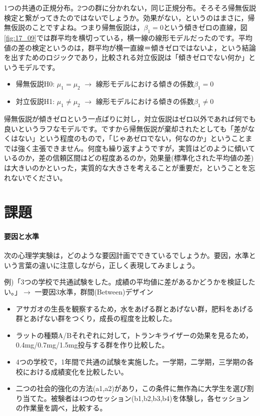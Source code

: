 \documentclass{ltjbook}
\begin{document}
1つの共通の正規分布。2つの群に分かれない，同じ正規分布。そろそろ帰無仮説検定と繋がってきたのではないでしょうか。効果がない，というのはまさに，帰無仮説のことですよね。つまり帰無仮説は，$\beta_1=0$という傾きゼロの直線，図\ref{fig:17_09}では群平均を横切っている，横一線の線形モデルだったのです。平均値の差の検定というのは，群平均が横一直線＝傾きゼロではないよ，という結論を出すためのロジックであり，比較される対立仮説は「傾きゼロでない何か」というモデルです。
\begin{itemize}
	\item 帰無仮説H0: $\mu_1 = \mu_2$ $\to$ 線形モデルにおける傾きの係数$\beta_1=0$
	\item 対立仮説H1: $\mu_1 \neq \mu_2$ $\to$ 線形モデルにおける傾きの係数$\beta_1\neq 0$
\end{itemize}
帰無仮説が傾きゼロという一点ばりに対し，対立仮説はゼロ以外であれば何でも良いというラフなモデルです。ですから帰無仮説が棄却されたとしても「差がなくはない」という程度のもので，「じゃあゼロでない，何なのか」ということまでは強く主張できません。何度も繰り返すようですが，実質はどのように傾いているのか，差の信頼区間はどの程度あるのか，効果量(標準化された平均値の差)は大きいのかといった，実質的な大きさを考えることが重要だ，ということを忘れないでください。


\section{課題}
\paragraph{要因と水準}次の心理学実験は，どのような要因計画でできているでしょうか。要因，水準という言葉の違いに注意しながら，正しく表現してみましょう。

例)「3つの学校で共通試験をした。成績の平均値に差があるかどうかを検証したい。」$\to$ 一要因3水準，群間(Between)デザイン

\begin{itemize}
	\item アサガオの生長を観察するため，水をあげる群とあげない群，肥料をあげる群とあげない群をつくり，成長の程度を比較した。
	\item ラットの種類A/Bそれぞれに対して，トランキライザーの効果を見るため，0.4mg/0.7mg/1.5mg投与する群を作り比較した。
	\item 4つの学校で，1年間で共通の試験を実施した。一学期，二学期，三学期の各校における成績変化を比較したい。
	\item 二つの社会的強化の方法(a1,a2)があり，この条件に無作為に大学生を選び割り当てた。被験者は4つのセッション(b1,b2,b3,b4)を体験し，各セッションの作業量を調べ，比較する。
\end{itemize}
\end{document}
